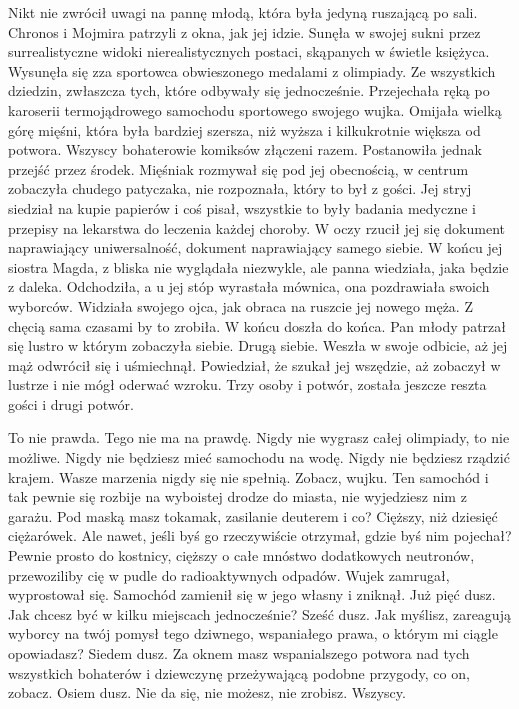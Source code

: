 Nikt nie zwrócił uwagi na pannę młodą, która była jedyną ruszającą po sali. Chronos i Mojmira patrzyli z okna, jak jej idzie.
Sunęła w swojej sukni przez surrealistyczne widoki nierealistycznych postaci, skąpanych w świetle księżyca.
Wysunęła się zza sportowca obwieszonego medalami z olimpiady. Ze wszystkich dziedzin, zwłaszcza tych, które odbywały się jednocześnie.
Przejechała ręką po karoserii termojądrowego samochodu sportowego swojego wujka.
Omijała wielką górę mięśni, która była bardziej szersza, niż wyższa i kilkukrotnie większa od potwora. Wszyscy bohaterowie komiksów złączeni razem.
Postanowiła jednak przejść przez środek. Mięśniak rozmywał się pod jej obecnością, w centrum zobaczyła chudego patyczaka, nie rozpoznała, który to był z gości.
Jej stryj siedział na kupie papierów i coś pisał, wszystkie to były badania medyczne i przepisy na lekarstwa do leczenia każdej choroby.
W oczy rzucił jej się dokument naprawiający uniwersalność, dokument naprawiający samego siebie.
W końcu jej siostra Magda, z bliska nie wyglądała niezwykle, ale panna wiedziała, jaka będzie z daleka. 
Odchodziła, a u jej stóp wyrastała mównica, ona pozdrawiała swoich wyborców.
Widziała swojego ojca, jak obraca na ruszcie jej nowego męża. Z chęcią sama czasami by to zrobiła.
W końcu doszła do końca. Pan młody patrzał się lustro w którym zobaczyła siebie. Drugą siebie.
Weszła w swoje odbicie, aż jej mąż odwrócił się i uśmiechnął. Powiedział, że szukał jej wszędzie, aż zobaczył w lustrze i nie mógł oderwać wzroku.
Trzy osoby i potwór, została jeszcze reszta gości i drugi potwór.

\ds{}
To nie prawda. Tego nie ma na prawdę.
Nigdy nie wygrasz całej olimpiady, to nie możliwe.
Nigdy nie będziesz mieć samochodu na wodę.
Nigdy nie będziesz rządzić krajem.
Wasze marzenia nigdy się nie spełnią.
Zobacz, wujku. Ten samochód i tak pewnie się rozbije na wyboistej drodze do miasta, nie wyjedziesz nim z garażu.
Pod maską masz tokamak, zasilanie deuterem i co? Cięższy, niż dziesięć ciężarówek.
Ale nawet, jeśli byś go rzeczywiście otrzymał, gdzie byś nim pojechał?
Pewnie prosto do kostnicy, cięższy o całe mnóstwo dodatkowych neutronów, przewoziliby cię w pudle do radioaktywnych odpadów.
\dm{} Wujek zamrugał, wyprostował się. Samochód zamienił się w jego własny i zniknął. Już pięć dusz. \dm{}
Jak chcesz być w kilku miejscach jednocześnie? \dm{} Sześć dusz. \dm{}
Jak myślisz, zareagują wyborcy na twój pomysł tego dziwnego, wspaniałego prawa, o którym mi ciągle opowiadasz? \dm{} Siedem dusz. \dm{}
Za oknem masz wspanialszego potwora nad tych wszystkich bohaterów i dziewczynę przeżywającą podobne przygody, co on, zobacz. \dm{} Osiem dusz. \dm{}
Nie da się, nie możesz, nie zrobisz. \dm{} Wszyscy. \dm{}

